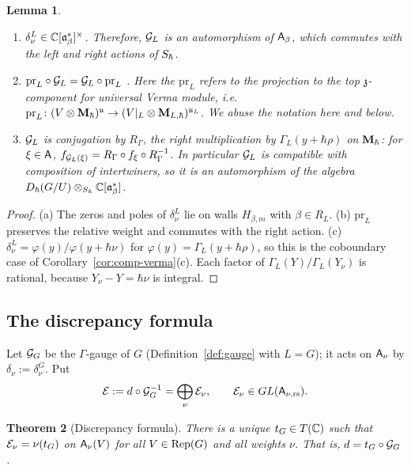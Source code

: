 \documentclass{article}
\theoremstyle{plain}
\newtheorem{theorem}{Theorem}[section]
\newtheorem{lemma}[theorem]{Lemma}
\theoremstyle{definition}
\theoremstyle{remark}
\numberwithin{equation}{section}
\begin{document}
\begin{lemma}\label{lem:gauge}
\begin{enumerate}[label=(\alph*)]
\item $\delta^L_\nu\in\mathbb{C}[\mathfrak{a}^*_{\beta}]^\times$. Therefore, $\mathcal G_L$ is an automorphism of $\mathsf A_\beta$, which commutes with the left and right actions of $S_\hbar$.
\item $\mathrm{pr}_L\circ\mathcal G_L=\mathcal G_L\circ\mathrm{pr}_L$ . Here the  $\mathrm{pr}_L$ refers to the projection to the top $\mathfrak{z}$-component for universal Verma module, i.e. $\mathrm{pr}_L\colon(V\otimes\mathbf{M}_\hbar)^{\mathfrak{u}}\to(V|_L\otimes\mathbf{M}_{L,\hbar})^{\mathfrak{u}_L}$. We abuse the notation here and below.
\item $\mathcal G_L$ is conjugation by $R_\Gamma$, the right multiplication by $\Gamma_L(y+\hbar\rho)$ on $\mathbf{M}_\hbar$: for $\xi\in\mathsf A$, $f_{\mathcal G_L(\xi)}=R_\Gamma\circ f_\xi\circ R_\Gamma^{-1}$. In particular $\mathcal G_L$ is compatible with composition of intertwiners, so it is an automorphism of the algebra $D_\hbar(G/U)\otimes_{S_\hbar}\mathbb{C}[\mathfrak{a}^*_{\beta}]$.
\end{enumerate}
\end{lemma}

\begin{proof}
(a) The zeros and poles of $\delta^L_\nu$ lie on walls $H_{\beta,m}$ with $\beta\in R_L$. (b) $\mathrm{pr}_L$ preserves the relative weight and commutes with the right action. (c) $\delta^L_\nu=\varphi(y)/\varphi(y+\hbar\nu)$ for $\varphi(y)=\Gamma_L(y+\hbar\rho)$, so this is the coboundary case of Corollary~\ref{cor:comp-verma}(c). Each factor of $\Gamma_L(Y)/\Gamma_L(Y_\nu)$ is rational, because $Y_\nu-Y=\hbar\nu$ is integral.
\end{proof}

\subsection{The discrepancy formula}\label{sec:disc-formula}
Let $\mathcal G_G$ be the $\Gamma$-gauge of $G$ (Definition~\ref{def:gauge} with $L=G$); it acts on $\mathsf A_\nu$ by $\delta_\nu:=\delta^G_\nu$. Put
\[
\mathcal E:=d\circ\mathcal G_G^{-1}=\bigoplus_\nu\mathcal E_\nu,\qquad\mathcal E_\nu\in GL(\mathsf A_{\nu,\mathrm{rs}}).
\]

\begin{theorem}[Discrepancy formula]\label{thm:DF}
There is a unique $t_G\in T(\mathbb{C})$ such that $\mathcal E_\nu=\nu(t_G)$ on $\mathsf A_\nu(V)$ for all $V\in\operatorname{Rep}(G)$ and all weights $\nu$. That is, $d=t_G\circ\mathcal G_G$.
\end{theorem}
\end{document}
